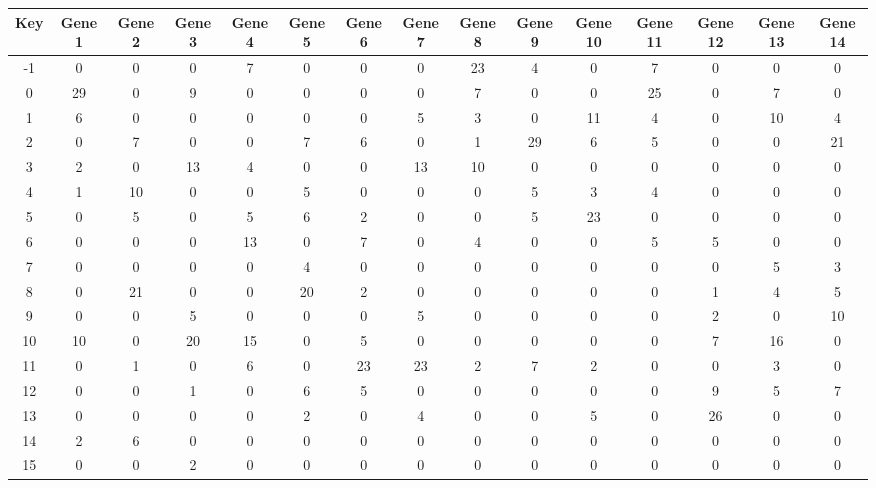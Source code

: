 \begin{tabular}{|c|c|c|c|c|c|c|c|c|c|c|c|c|c|c|}
\hline
Key & Gene 1 & Gene 2 & Gene 3 & Gene 4 & Gene 5 & Gene 6 & Gene 7 & Gene 8 & Gene 9 & Gene 10 & Gene 11 & Gene 12 & Gene 13 & Gene 14 \\
\hline
-1 & 0 & 0 & 0 & 7 & 0 & 0 & 0 & 23 & 4 & 0 & 7 & 0 & 0 & 0 \\
0 & 29 & 0 & 9 & 0 & 0 & 0 & 0 & 7 & 0 & 0 & 25 & 0 & 7 & 0 \\
1 & 6 & 0 & 0 & 0 & 0 & 0 & 5 & 3 & 0 & 11 & 4 & 0 & 10 & 4 \\
2 & 0 & 7 & 0 & 0 & 7 & 6 & 0 & 1 & 29 & 6 & 5 & 0 & 0 & 21 \\
3 & 2 & 0 & 13 & 4 & 0 & 0 & 13 & 10 & 0 & 0 & 0 & 0 & 0 & 0 \\
4 & 1 & 10 & 0 & 0 & 5 & 0 & 0 & 0 & 5 & 3 & 4 & 0 & 0 & 0 \\
5 & 0 & 5 & 0 & 5 & 6 & 2 & 0 & 0 & 5 & 23 & 0 & 0 & 0 & 0 \\
6 & 0 & 0 & 0 & 13 & 0 & 7 & 0 & 4 & 0 & 0 & 5 & 5 & 0 & 0 \\
7 & 0 & 0 & 0 & 0 & 4 & 0 & 0 & 0 & 0 & 0 & 0 & 0 & 5 & 3 \\
8 & 0 & 21 & 0 & 0 & 20 & 2 & 0 & 0 & 0 & 0 & 0 & 1 & 4 & 5 \\
9 & 0 & 0 & 5 & 0 & 0 & 0 & 5 & 0 & 0 & 0 & 0 & 2 & 0 & 10 \\
10 & 10 & 0 & 20 & 15 & 0 & 5 & 0 & 0 & 0 & 0 & 0 & 7 & 16 & 0 \\
11 & 0 & 1 & 0 & 6 & 0 & 23 & 23 & 2 & 7 & 2 & 0 & 0 & 3 & 0 \\
12 & 0 & 0 & 1 & 0 & 6 & 5 & 0 & 0 & 0 & 0 & 0 & 9 & 5 & 7 \\
13 & 0 & 0 & 0 & 0 & 2 & 0 & 4 & 0 & 0 & 5 & 0 & 26 & 0 & 0 \\
14 & 2 & 6 & 0 & 0 & 0 & 0 & 0 & 0 & 0 & 0 & 0 & 0 & 0 & 0 \\
15 & 0 & 0 & 2 & 0 & 0 & 0 & 0 & 0 & 0 & 0 & 0 & 0 & 0 & 0 \\
\hline
\end{tabular}